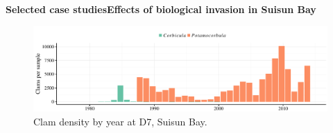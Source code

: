 \documentclass[serif]{beamer}\usepackage[]{graphicx}\usepackage[]{color}
\begin{document}
\begin{frame}{\textbf{Selected case studies}}{\textbf{Effects of biological invasion in Suisun Bay}}
\vspace{-0.1in}
\begin{figure}
\centerline{\includegraphics[width = \textwidth]{fig/d7clam.pdf}}
\caption{Clam density by year at D7, Suisun Bay.}
\end{figure}
\vspace{-0.1in}
\begin{columns}
\begin{column}{0.35\textwidth}
\end{column}
\begin{column}{0.35\textwidth}
\end{column}
\end{columns}
\end{frame}
\end{document}
